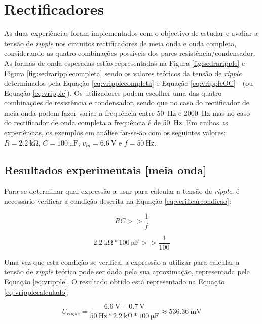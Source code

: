\section{Rectificadores}
\label{sec:resultados_rectificadores}
As duas experiências foram implementados com o objectivo de estudar e avaliar a tensão de \textit{ripple} nos circuitos rectificadores de meia onda e onda completa, considerando as quatro combinações possíveis dos pares resistência/condensador. As formas de onda esperadas estão representadas na Figura \ref{fig:sedraripple} e Figura \ref{fig:sedraripplecompleta} sendo os valores teóricos da tensão de \textit{ripple} determinados pela Equação \ref{eq:vripplecompleta} e Equação \ref{eq:vrippleOC} - (ou Equação \ref{eq:vripple}). Os utilizadores podem escolher uma das quatro combinações de resistência e condensador, sendo que no caso do rectificador de meia onda podem fazer variar a frequência entre \SI{50}{\hertz} e \SI{2000}{\hertz} mas no caso do rectificador de onda completa a frequência é de \SI{50}{\hertz}. Em ambos as experiências, os exemplos em análise far-se-ão com os seguintes valores: $R=\SI{2.2}{\kilo\ohm}$, $C=\SI{100}{\micro\farad}$, $v_{in}=\SI{6.6}{\volt}$ e $f=\SI{50}{\hertz}$.

\subsection{Resultados experimentais [meia onda]}
\label{sec:resultados_RectificadoresMeiaOnda}
Para se determinar qual expressão a usar para calcular a tensão de \textit{ripple}, é necessário verificar a condição descrita na Equação \ref{eq:verificarcondicao}:

\begin{equation} \label{eq:verificarcondicao}
	RC >> \dfrac{1}{f}
\end{equation}

\begin{equation}
	\SI{2.2}{\kilo\ohm} * \SI{100}{\micro\farad} >> \dfrac{1}{100}
\end{equation}

Uma vez que esta condição se verifica, a expressão a utilizar para calcular a tensão de \textit{ripple} teórica pode ser dada pela sua aproximação, representada pela Equação \ref{eq:vripple}. O resultado obtido está representado na Equação \ref{eq:vripplecalculado}:

\begin{equation} \label{eq:vripplecalculado}
	U_{ripple} = \frac{\SI{6.6}{\volt}-\SI{0.7}{\volt}}{\SI{50}{\hertz}*\SI{2.2}{\kilo\ohm}*\SI{100}{\micro\farad}} \approx \SI{536.36}{\milli\volt}
\end{equation}


